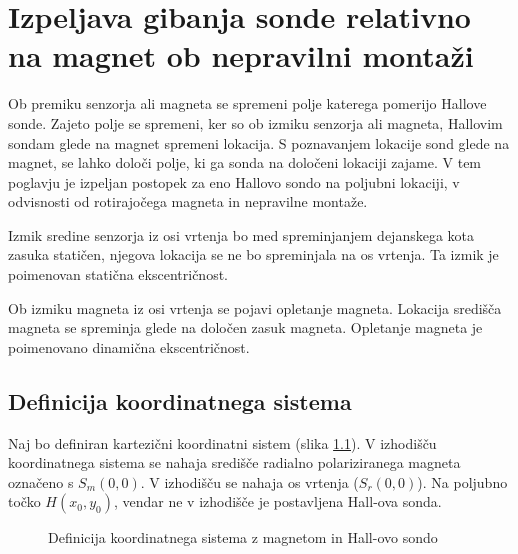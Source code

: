 \chapter{Izpeljava gibanja sonde relativno na magnet ob nepravilni montaži}

Ob premiku senzorja ali magneta se spremeni polje katerega pomerijo Hallove sonde.
Zajeto polje se  spremeni, ker so ob izmiku senzorja ali magneta, Hallovim sondam glede na magnet spremeni lokacija.
S poznavanjem lokacije sond glede na magnet, se lahko določi polje, ki ga sonda na določeni lokaciji zajame.
V tem poglavju je izpeljan postopek za eno Hallovo sondo na poljubni lokaciji, v odvisnosti od rotirajočega magneta in nepravilne montaže.



Izmik sredine senzorja iz osi vrtenja bo med spreminjanjem dejanskega kota zasuka statičen, njegova lokacija se ne bo spreminjala na os vrtenja. Ta izmik je poimenovan statična ekscentričnost.

Ob izmiku magneta iz osi vrtenja se pojavi opletanje magneta. Lokacija središča magneta se spreminja glede na določen zasuk magneta. Opletanje magneta je poimenovano dinamična ekscentričnost.
\section{Definicija koordinatnega sistema}
Naj bo definiran kartezični koordinatni sistem (slika \ref{fig:def_kks}). V izhodišču koordinatnega sistema se nahaja središče radialno polariziranega magneta označeno s $S_m(0, 0)$. V izhodišču se nahaja os vrtenja ($S_r(0, 0)$). Na poljubno točko $H(x_0,y_0)$, vendar ne v
izhodišče je postavljena Hall-ova sonda.
\begin{figure}[!ht]
	\centering
	\caption{Definicija koordinatnega sistema z magnetom in Hall-ovo sondo}
	\label{fig:def_kks}
\end{figure}

